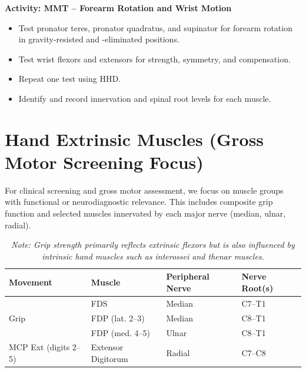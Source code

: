 \begin{labactivitybox}
\textbf{Activity: MMT – Forearm Rotation and Wrist Motion}

\begin{itemize}
  \item Test pronator teres, pronator quadratus, and supinator for forearm rotation in gravity-resisted and -eliminated positions.
  \item Test wrist flexors and extensors for strength, symmetry, and compensation.
  \item Repeat one test using HHD.
  \item Identify and record innervation and spinal root levels for each muscle.
\end{itemize}
\end{labactivitybox}

\section*{Hand Extrinsic Muscles (Gross Motor Screening Focus)}

\noindent
For clinical screening and gross motor assessment, we focus on muscle groups with functional or neurodiagnostic relevance. This includes composite grip function and selected muscles innervated by each major nerve (median, ulnar, radial).

\begin{table}[H]
\centering
\captionsetup{justification=raggedright, singlelinecheck=false}
\begin{tabular}{|p{4cm}|p{4.5cm}|p{4cm}|p{2.5cm}|}
\hline
\textbf{Movement} & \textbf{Muscle} & \textbf{Peripheral Nerve} & \textbf{Nerve Root(s)} \\
\hline
\multirow{3}{*}{Grip} 
  & FDS & Median & C7–T1 \\
  & FDP (lat. 2–3) & Median & C8–T1 \\
  & FDP (med. 4–5) & Ulnar & C8–T1 \\
\hline
MCP Ext (digits 2–5)
  & Extensor Digitorum & Radial & C7–C8 \\
\hline
\end{tabular}
\caption{\textit{Note: Grip strength primarily reflects extrinsic flexors but is also influenced by intrinsic hand muscles such as interossei and thenar muscles.}}
\end{table}

\vspace{0.5cm}

